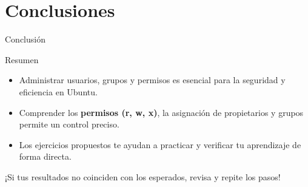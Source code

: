 \documentclass{beamer}
\begin{document}
\section{Conclusiones}

\begin{frame}{Conclusión}
    \begin{block}{Resumen}
    \begin{itemize}
        \item Administrar usuarios, grupos y permisos es esencial para la seguridad y eficiencia en Ubuntu.
        \item Comprender los \textbf{permisos (r, w, x)}, la asignación de propietarios y grupos permite un control preciso.
        \item Los ejercicios propuestos te ayudan a practicar y verificar tu aprendizaje de forma directa.
    \end{itemize}
    \end{block}
    \vspace{0.5cm}
    \centering
    \alert{¡Si tus resultados no coinciden con los esperados, revisa y repite los pasos!}
\end{frame}

\end{document}
